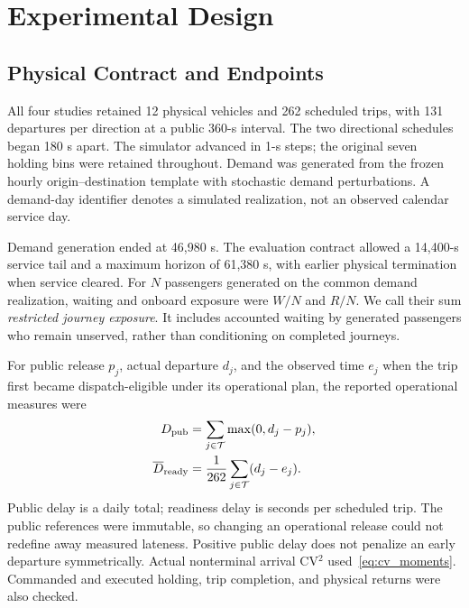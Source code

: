 \section{Experimental Design}
\label{sec:experiments}
\subsection{Physical Contract and Endpoints}
All four studies retained 12 physical vehicles and 262 scheduled trips, with 131 departures per direction at a public 360-s interval. The two directional schedules began 180 s apart. The simulator advanced in 1-s steps; the original seven holding bins were retained throughout. Demand was generated from the frozen hourly origin--destination template with stochastic demand perturbations. A demand-day identifier denotes a simulated realization, not an observed calendar service day.

Demand generation ended at 46,980 s. The evaluation contract allowed a 14,400-s service tail and a maximum horizon of 61,380 s, with earlier physical termination when service cleared. For $N$ passengers generated on the common demand realization, waiting and onboard exposure were $W/N$ and $R/N$. We call their sum \emph{restricted journey exposure}. It includes accounted waiting by generated passengers who remain unserved, rather than conditioning on completed journeys.

For public release $p_j$, actual departure $d_j$, and the observed time $e_j$ when the trip first became dispatch-eligible under its operational plan, the reported operational measures were
\begin{align}
 D_{\rm pub}&=\sum_{j\in\mathcal T}\max(0,d_j-p_j),\\
 \overline D_{\rm ready}&=\frac{1}{262}\sum_{j\in\mathcal T}(d_j-e_j).
\end{align}
Public delay is a daily total; readiness delay is seconds per scheduled trip. The public references were immutable, so changing an operational release could not redefine away measured lateness. Positive public delay does not penalize an early departure symmetrically. Actual nonterminal arrival CV$^2$ used~\eqref{eq:cv_moments}. Commanded and executed holding, trip completion, and physical returns were also checked.

